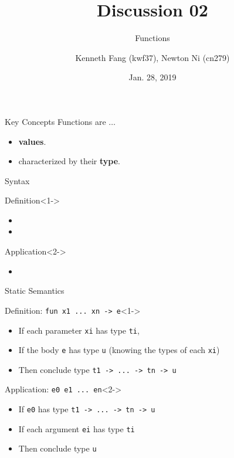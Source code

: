 \documentclass{beamer}
\title{Discussion 02}
\subtitle{Functions}
\author{Kenneth Fang (kwf37), Newton Ni (cn279)}
\date{Jan. 28, 2019}
\newcommand{\code}[1]{\texttt{#1}}
\begin{document}
    \begin{frame}
        \titlepage{}
    \end{frame}

    \begin{frame}{Key Concepts}
        Functions are $\ldots$
        \begin{itemize}
            \item<1-> \textbf{values}.
            \item<2-> characterized by their \textbf{type}.
        \end{itemize}
    \end{frame}

    \begin{frame}{Syntax}
        \begin{block}{Definition}<1->
            \begin{itemize}
                \item {}
                \item {}
            \end{itemize}
        \end{block}

        \begin{block}{Application}<2->
            \begin{itemize}
                \item {} 
            \end{itemize}
        \end{block}

    \end{frame}

    \begin{frame}{Static Semantics}
        \begin{block}{Definition: \code{fun x1 ... xn -> e}}<1->
            \begin{itemize}
                \item If each parameter \code{xi} has type \code{ti},
                \item If the body \code{e} has type \code{u} (knowing the types of each \code{xi})
                \item Then conclude type \code{t1 -> ... -> tn -> u}
            \end{itemize}
        \end{block}

        \begin{block}{Application: \code{e0 e1 ... en}}<2->
            \begin{itemize}
                \item If \code{e0} has type \code{t1 -> ... -> tn -> u}
                \item If each argument \code{ei} has type \code{ti}
                \item Then conclude type \code{u}
            \end{itemize}
        \end{block}
    \end{frame}
\end{document}

